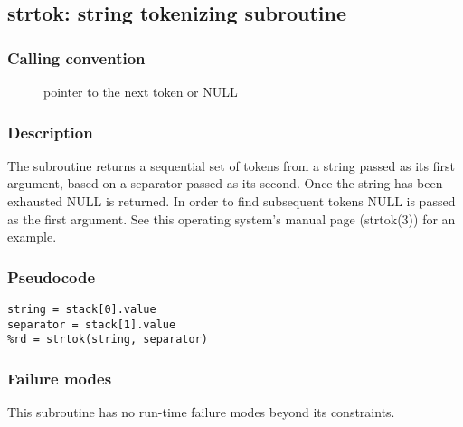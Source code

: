 \clearpage
{}
{}
\label{subr:strtok}
\subsection*{strtok: string tokenizing subroutine}

\subsubsection*{Calling convention}

\begin{description}
\item[] pointer to the next token or NULL
\end{description}

\subsubsection*{Description}

The  subroutine returns a sequential set of tokens
from a string passed as its first argument, based on a separator
passed as its second.  Once the string has been exhausted NULL is
returned.  In order to find subsequent tokens NULL is passed as the
first argument.  See this operating system's 
manual page (strtok(3)) for an example.

\subsubsection*{Pseudocode}

\begin{verbatim}
string = stack[0].value
separator = stack[1].value
%rd = strtok(string, separator)
\end{verbatim}

\subsubsection*{Failure modes}

This subroutine has no run-time failure modes beyond its constraints.
